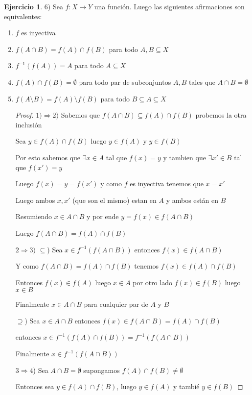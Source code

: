\documentclass[12pt]{article}
\newcommand{\Ra}{\Rightarrow}
\newcommand{\ra}{\rightarrow}
\theoremstyle{definition}
\newtheorem{ej}{Ejercicio}
\begin{document}
\begin{ej}
6) Sea $f: X \ra Y$ una función. Luego las siguientes afirmaciones son equivalentes:
\begin{enumerate}
  \item $f$ es inyectiva
  \item $f(A \cap B) = f(A) \cap f(B)$ para todo $A,B \subseteq X$
  \item $f^{-1}(f(A)) = A$ para todo $A \subseteq X$
  \item $f(A) \cap f(B) = \emptyset$ para todo par de subconjuntos $A,B $ tales que $A \cap B = \emptyset$
  \item $f(A \setminus B) = f(A) \setminus f(B)$ para todo $B \subseteq A \subseteq X$
    \begin{proof}
  $1) \Ra 2)$ Sabemos que $f(A \cap B) \subseteq f(A) \cap f(B)$ probemos la otra inclusión
  
  Sea $y \in f(A) \cap f(B)$ luego $y \in f(A)$ y $y \in f(B)$ 

  Por esto sabemos que $\exists x \in A$ tal que $f(x) = y$ y tambien que $\exists x' \in B$ tal que $f(x') = y$

  Luego $f(x) = y = f(x')$ y como $f$ es inyectiva tenemos que $x = x'$

  Luego ambos $x,x' $ (que son el mismo) estan en $A$ y ambos están en $B$

  Resumiendo $x \in A \cap B$ y por ende $y = f(x) \in f(A \cap B)$

  Luego $f(A \cap B) = f(A) \cap f(B)$

  $2 \Ra 3)$ $\subseteq$) Sea $x \in f^{-1}(f(A \cap B))$ entonces $f(x) \in f(A \cap B)$

Y como $f(A \cap B) = f(A) \cap f(B)$ tenemos $f(x) \in f(A) \cap f(B)$  

Entonces $f(x) \in f(A)$ luego $x \in A$ por otro lado $f(x) \in f(B)$ luego $x \in B$

Finalmente $x \in A \cap B$ para cualquier par de $A$ y $B$

$\supseteq$) Sea $x\in A \cap B$ entonces $f(x) \in f(A\cap B) = f(A) \cap f(B)$

entonces $x \in f^{-1}(f(A) \cap f(B)) = f^{-1}(f(A \cap B)) $

Finalmente $x \in f^{-1}(f(A\cap B))$

$3 \Ra 4$) Sea $A \cap B = \emptyset $ supongamos $f(A) \cap f(B) \neq \emptyset$ 

Entonces sea $y \in f(A) \cap f(B)$, luego $y \in f(A)$ y tambié $y \in f(B)$


\end{proof}
\end{enumerate}
\end{ej}
\end{document}
